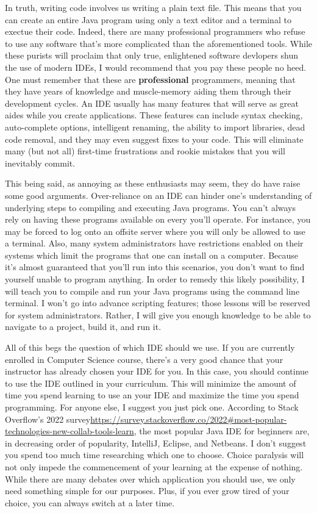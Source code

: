 In truth, writing code involves us writing a plain text file.
This means that you can create an entire Java program using only a text editor and a terminal to exectue their code.
Indeed, there are many professional programmers who refuse to use any software that's more complicated than the aforementioned tools.
While these purists will proclaim that only true, enlightened software devlopers shun the use of modern \gls{IDE}s, I would recommend that you pay these people no heed.
One must remember that these are \textbf{professional} programmers, meaning that they have years of knowledge and muscle-memory aiding them through their development cycles.
An \gls{IDE} usually has many features that will serve as great aides while you create applications.
These features can include syntax checking, auto-complete options, intelligent renaming, the ability to import libraries, dead code removal, and they may even suggest fixes to your code.
This will eliminate many (but not all) first-time frustrations and rookie mistakes that you will inevitably commit.

This being said, as annoying as these enthusiasts may seem, they do have raise some good arguments.
Over-reliance on an IDE can hinder one's understanding of underlying steps to compiling and executing Java programs.
You can't always rely on having these programs available on every you'll operate.
For instance, you may be forced to log onto an offsite server where you will only be allowed to use a terminal.
Also, many system administrators have restrictions enabled on their systems which limit the programs that one can install on a computer.
Because it's almost guaranteed that you'll run into this scenarios, you don't want to find yourself unable to program anything.
In order to remedy this likely possibility, I will teach you to compile and run your Java programs using the command line terminal.
I won't go into advance scripting features; those lessons will be reserved for system administrators.
Rather, I will give you enough knowledge to be able to navigate to a project, build it, and run it.



All of this begs the question of which \gls{IDE} should we use.
If you are currently enrolled in Computer Science course, there's a very good chance that your instructor has already chosen your IDE for you.
In this case, you should continue to use the \gls{IDE} outlined in your curriculum.
This will minimize the amount of time you spend learning to use an your IDE and maximize the time you spend programming.
For anyone else, I suggest you just pick one.
According to Stack Overflow's 2022 survey\url{https://survey.stackoverflow.co/2022#most-popular-technologies-new-collab-tools-learn}, the most popular Java \gls{IDE} for beginners are, in decreasing order of popularity, IntelliJ, Eclipse, and Netbeans.
I don't suggest you spend too much time researching which one to choose.
Choice paralysis will not only impede the commencement of your learning at the expense of nothing.
While there are many debates over which application you should use, we only need something simple for our purposes.
Plus, if you ever grow tired of your choice, you can always switch at a later time.




